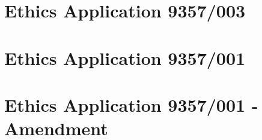 
\chapter{Ethics Application 9357/003}
\label{app:ethics3}


\chapter{Ethics Application 9357/001}
\label{app:ethics1}


\chapter{Ethics Application 9357/001 - Amendment}
\label{app:ethics2}


